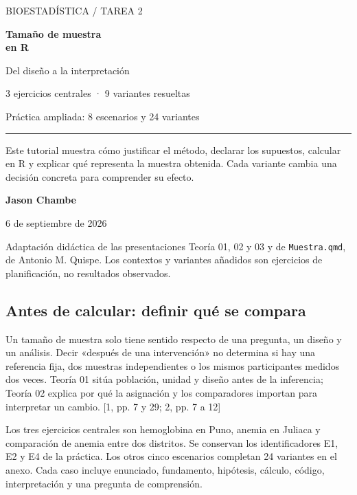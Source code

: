\documentclass[10pt,a4paper]{article}
\begin{document}
\begin{titlepage}
{\color{Blue}\large BIOESTADÍSTICA \quad / \quad TAREA 2}
\vspace*{27mm}

{\color{Navy}\fontsize{35}{41}\selectfont\bfseries Tamaño de muestra\\en R\par}
\vspace{8mm}
{\color{Gray}\fontsize{20}{26}\selectfont Del diseño a la interpretación\par}
\vspace{13mm}
{\color{Blue}\Large 3 ejercicios centrales · 9 variantes resueltas\par}
\vspace{4mm}
{\large Práctica ampliada: 8 escenarios y 24 variantes\par}
\vspace{13mm}
\hrule
\vspace{6mm}
\begin{minipage}{0.88\linewidth}
Este tutorial muestra cómo justificar el método, declarar los supuestos, calcular en R y explicar qué representa la muestra obtenida. Cada variante cambia una decisión concreta para comprender su efecto.
\end{minipage}
\vfill
{\Large\bfseries Jason Chambe\par}
{\color{Gray}6 de septiembre de 2026\par}
\vspace{5mm}
Adaptación didáctica de las presentaciones Teoría 01, 02 y 03 y de \texttt{Muestra.qmd}, de Antonio M. Quispe. Los contextos y variantes añadidos son ejercicios de planificación, no resultados observados.
\end{titlepage}
\subsection*{Antes de calcular: definir qué se compara}

Un tamaño de muestra solo tiene sentido respecto de una pregunta, un diseño y un análisis. Decir «después de una intervención» no determina si hay una referencia fija, dos muestras independientes o los mismos participantes medidos dos veces. Teoría 01 sitúa población, unidad y diseño antes de la inferencia; Teoría 02 explica por qué la asignación y los comparadores importan para interpretar un cambio. [1, pp. 7 y 29; 2, pp. 7 a 12]

Los tres ejercicios centrales son hemoglobina en Puno, anemia en Juliaca y comparación de anemia entre dos distritos. Se conservan los identificadores E1, E2 y E4 de la práctica. Los otros cinco escenarios completan 24 variantes en el anexo. Cada caso incluye enunciado, fundamento, hipótesis, cálculo, código, interpretación y una pregunta de comprensión.
\end{document}
